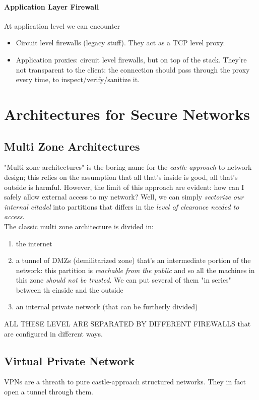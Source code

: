 \documentclass{article}
\begin{document}
				\paragraph{Application Layer Firewall}
					At application level we can encounter
					\begin{itemize}
						\item Circuit level firewalls (legacy stuff). They act as a TCP level proxy.
						\item Application proxies: circuit level firewalls, but on top of the stack. They're not transparent to the client: the connection should pass through the proxy every time, to inspect/verify/sanitize it. 
					\end{itemize}
		
		\section{Architectures for Secure Networks}
			\subsection{Multi Zone Architectures}
				"Multi zone architectures" is the boring name for the \emph{castle approach} to network design; this relies on the assumption that all that's inside is good, all that's outside is harmful. However, the limit of this approach are evident: how can I safely allow external access to my network? Well, we can simply \emph{sectorize our internal citadel} into partitions that differs in the \emph{level of clearance needed to access}.\\
				The classic multi zone architecture is divided in:
				\begin{enumerate}
					\item the internet
					\item a tunnel of DMZs (demilitarized zone) that's an intermediate portion of the network: this partition is \emph{reachable from the public} and so all the machines in this zone \emph{should not be trusted}. We can put several of them "in series" between th einside and the outside
					\item an internal private network (that can be furtherly divided)
				\end{enumerate}
				ALL THESE LEVEL ARE SEPARATED BY DIFFERENT FIREWALLS that are configured in different ways.
				
			\subsection{Virtual Private Network}
				VPNs are a threath to pure castle-approach structured networks. They in fact open a tunnel through them.
				
\end{document}

